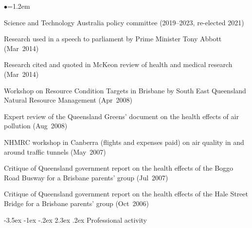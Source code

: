 \documentclass[a4paper,11pt]{article}
\makeatletter
\renewcommand\section{\@startsection {section}{1}{\z@}%
                                   {-3.5ex \@plus -1ex \@minus -.2ex}%
                                   {2.3ex \@plus.2ex}%
                                   {\normalfont\large\bfseries\color{blue}}}
\renewcommand{\labelitemi}{$\bullet$}
\makeatother
\begin{document}
\begin{raggedright}
\begin{list}{\labelitemi}{\leftmargin=1.2em}\addtolength{\itemsep}{-0.4\baselineskip}
\item Science and Technology Australia policy committee (2019--2023, re-elected 2021)
\item Research used in a speech to parliament by Prime Minister Tony Abbott (Mar~2014)
\item Research cited and quoted in McKeon review of health and medical research (Mar~2014)
\item Workshop on Resource Condition Targets in Brisbane by South East Queensland Natural Resource Management (Apr~2008)
\item Expert review of the Queensland Greens' document on the health effects of air pollution (Aug~2008)
\item NHMRC workshop in Canberra (flights and expenses paid) on air quality in and around traffic tunnels (May~2007)
\item Critique of Queensland government report on the health effects of the Boggo Road Busway for a Brisbane parents' group (Jul~2007)
\item Critique of Queensland government report on the health effects of the Hale Street Bridge for a Brisbane parents' group (Oct~2006)
\end{list}

\section{Professional activity}


\end{raggedright}
\end{document}
